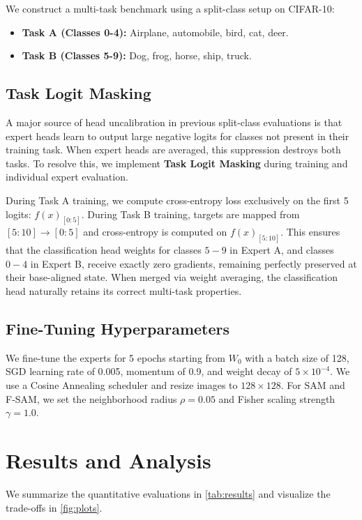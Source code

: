 \documentclass{article}
\theoremstyle{plain}
\theoremstyle{definition}
\theoremstyle{remark}
\begin{document}
We construct a multi-task benchmark using a split-class setup on CIFAR-10:
\begin{itemize}\setlength{\itemsep}{0pt}\setlength{\parskip}{0pt}\setlength{\parsep}{0pt}
    \item \textbf{Task A (Classes 0-4):} Airplane, automobile, bird, cat, deer.
    \item \textbf{Task B (Classes 5-9):} Dog, frog, horse, ship, truck.
\end{itemize}

\subsection{Task Logit Masking}
A major source of head uncalibration in previous split-class evaluations is that expert heads learn to output large negative logits for classes not present in their training task. When expert heads are averaged, this suppression destroys both tasks. To resolve this, we implement \textbf{Task Logit Masking} during training and individual expert evaluation. 

During Task A training, we compute cross-entropy loss exclusively on the first 5 logits: $f(x)_{[0:5]}$. During Task B training, targets are mapped from $[5:10] \to [0:5]$ and cross-entropy is computed on $f(x)_{[5:10]}$. This ensures that the classification head weights for classes $5-9$ in Expert A, and classes $0-4$ in Expert B, receive exactly zero gradients, remaining perfectly preserved at their base-aligned state. When merged via weight averaging, the classification head naturally retains its correct multi-task properties.

\subsection{Fine-Tuning Hyperparameters}
We fine-tune the experts for 5 epochs starting from $W_0$ with a batch size of 128, SGD learning rate of 0.005, momentum of 0.9, and weight decay of $5\times 10^{-4}$. We use a Cosine Annealing scheduler and resize images to $128 \times 128$. For SAM and F-SAM, we set the neighborhood radius $\rho = 0.05$ and Fisher scaling strength $\gamma = 1.0$.

\section{Results and Analysis}
\label{sec:results}

We summarize the quantitative evaluations in \cref{tab:results} and visualize the trade-offs in \cref{fig:plots}.
\end{document}
